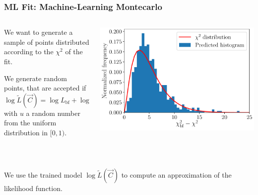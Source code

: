 \documentclass[mathserif, 10pt]{beamer}
\begin{document}
\begin{frame}\frametitle{ML Fit: Machine-Learning Montecarlo}
    \begin{columns}
        \begin{column}{0.5\textwidth}
            We want to generate a sample of points distributed according to the $\chi^2$ of the fit.

            We generate random points, that are accepted if
            $$\log \tilde{L}(\vec{C}) = \log L_\mathrm{bf} + \log u\,,$$
            with $u$ a random number from the uniform distribution in $[0,1)$. %
        \end{column}
        \begin{column}{0.5\textwidth}
            \includegraphics[width=\columnwidth]{figures/hist_xgb.pdf}
        \end{column}
    \end{columns}

    ~

    We use the trained model $\log\tilde{L}(\vec{C})$ to compute an approximation of the likelihood function.

\end{frame}
\end{document}
